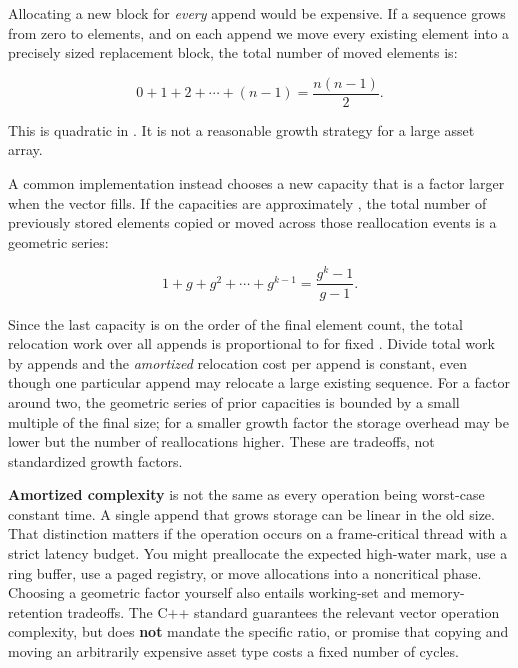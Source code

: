 \hypertarget{01-foundations-i-ch006-why-vectors-usually-grow-geometrically-derive-the-cost-instead-of-repeating-amortized-o1}{}

Allocating a new block for \emph{every} append would be expensive. If a sequence grows from zero to  elements, and on each append we move every existing element into a precisely sized replacement block, the total number of moved elements is:

\[
0+1+2+\cdots+(n-1)=\frac{n(n-1)}{2}.
\]

This is quadratic in . It is not a reasonable growth strategy for a large asset array.

A common implementation instead chooses a new capacity that is a factor  larger when the vector fills. If the capacities are approximately , the total number of previously stored elements copied or moved across those reallocation events is a geometric series:

\[
1+g+g^2+\cdots+g^{k-1}
=\frac{g^k-1}{g-1}.
\]

Since the last capacity is on the order of the final element count, the total relocation work over all appends is proportional to  for fixed . Divide total work by  appends and the \emph{amortized} relocation cost per append is constant, even though one particular append may relocate a large existing sequence. For a factor around two, the geometric series of prior capacities is bounded by a small multiple of the final size; for a smaller growth factor the storage overhead may be lower but the number of reallocations higher. These are tradeoffs, not standardized growth factors.

\textbf{Amortized complexity} is not the same as every operation being worst-case constant time. A single append that grows storage can be linear in the old size. That distinction matters if the operation occurs on a frame-critical thread with a strict latency budget. You might preallocate the expected high-water mark, use a ring buffer, use a paged registry, or move allocations into a noncritical phase. Choosing a geometric factor yourself also entails working-set and memory-retention tradeoffs. The C++ standard guarantees the relevant vector operation complexity, but does \textbf{not} mandate the specific ratio, or promise that copying and moving an arbitrarily expensive asset type costs a fixed number of cycles.

